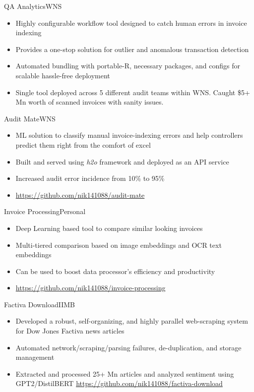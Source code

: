\documentclass[11pt,a4paper,]{moderncv}
\begin{document}
    {QA Analytics}{WNS}{}{}{
    \begin{itemize}
        \item Highly configurable workflow tool designed to catch human errors in invoice indexing
        \item Provides a one-stop solution for outlier and anomalous transaction detection
        \item Automated bundling with portable-R, necessary packages, and configs for scalable hassle-free deployment
        \item Single tool deployed across 5 different audit teams within WNS. Caught \$5+ Mn worth of scanned invoices with sanity issues.
    \end{itemize}
    }
    {Audit Mate}{WNS}{}{}{
    \begin{itemize}
        \item ML solution to classify manual invoice-indexing errors and help controllers predict them right from the comfort of excel
        \item Built and served using \emph{h2o} framework and deployed as an API service
        \item Increased audit error incidence from 10\% to 95\%
        \item \url{https://github.com/nik141088/audit-mate}
    \end{itemize}
    }
    {Invoice Processing}{Personal}{}{}{
    \begin{itemize}
        \item Deep Learning based tool to compare similar looking invoices
        \item Multi-tiered comparison based on image embeddings and OCR text embeddings
        \item Can be used to boost data processor's efficiency and productivity
        \item \url{https://github.com/nik141088/invoice-processing}
    \end{itemize}
    }
    {Factiva Download}{IIMB}{}{}{
    \begin{itemize}
        \item Developed a robust, self-organizing, and highly parallel web-scraping system for Dow Jones Factiva news articles
        \item Automated network/scraping/parsing failures, de-duplication, and storage management
        \item Extracted and processed 25+ Mn articles and analyzed sentiment using GPT2/DistilBERT
        \url{https://github.com/nik141088/factiva-download}
    \end{itemize}
    }
\end{document}
